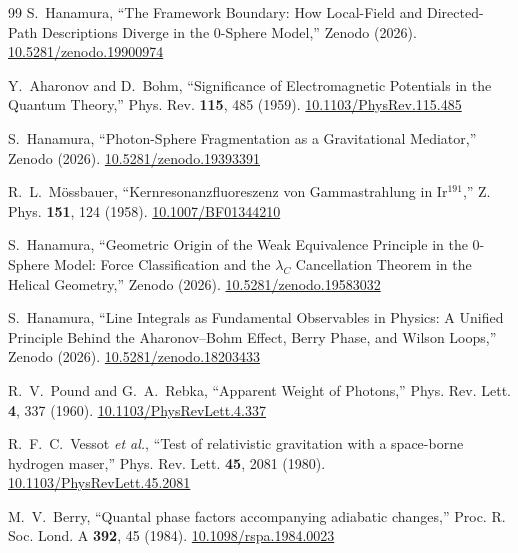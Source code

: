 \documentclass[%
 reprint, amsmath,amssymb, aps, prb, ]{revtex4-2}
\numberwithin{equation}{section}
\begin{document}
\begin{thebibliography}{99}
S.~Hanamura, ``The Framework Boundary: How Local-Field and Directed-Path Descriptions Diverge in the 0-Sphere Model,'' Zenodo (2026). \href{https://doi.org/10.5281/zenodo.19900974}{10.5281/zenodo.19900974}

Y.~Aharonov and D.~Bohm, ``Significance of Electromagnetic Potentials in the Quantum Theory,'' Phys. Rev. \textbf{115}, 485 (1959). \href{https://doi.org/10.1103/PhysRev.115.485}{10.1103/PhysRev.115.485}

S.~Hanamura, ``Photon-Sphere Fragmentation as a Gravitational Mediator,'' Zenodo (2026). \href{https://doi.org/10.5281/zenodo.19393391}{10.5281/zenodo.19393391}

R.~L.~M\"ossbauer, ``Kernresonanzfluoreszenz von Gammastrahlung in Ir$^{191}$,'' Z. Phys. \textbf{151}, 124 (1958). \href{https://doi.org/10.1007/BF01344210}{10.1007/BF01344210}

S.~Hanamura, ``Geometric Origin of the Weak Equivalence Principle in the 0-Sphere Model: Force Classification and the $\lambda_C$ Cancellation Theorem in the Helical Geometry,'' Zenodo (2026). \href{https://doi.org/10.5281/zenodo.19583032}{10.5281/zenodo.19583032}

S.~Hanamura, ``Line Integrals as Fundamental Observables in Physics: A Unified Principle Behind the Aharonov--Bohm Effect, Berry Phase, and Wilson Loops,'' Zenodo (2026). \href{https://doi.org/10.5281/zenodo.18203433}{10.5281/zenodo.18203433}

R.~V.~Pound and G.~A.~Rebka, ``Apparent Weight of Photons,'' Phys. Rev. Lett. \textbf{4}, 337 (1960). \href{https://doi.org/10.1103/PhysRevLett.4.337}{10.1103/PhysRevLett.4.337}

R.~F.~C.~Vessot \textit{et al.}, ``Test of relativistic gravitation with a space-borne hydrogen maser,'' Phys. Rev. Lett. \textbf{45}, 2081 (1980). \href{https://doi.org/10.1103/PhysRevLett.45.2081}{10.1103/PhysRevLett.45.2081}

M.~V.~Berry, ``Quantal phase factors accompanying adiabatic changes,'' Proc. R. Soc. Lond. A \textbf{392}, 45 (1984). \href{https://doi.org/10.1098/rspa.1984.0023}{10.1098/rspa.1984.0023}

\end{thebibliography}
\end{document}

